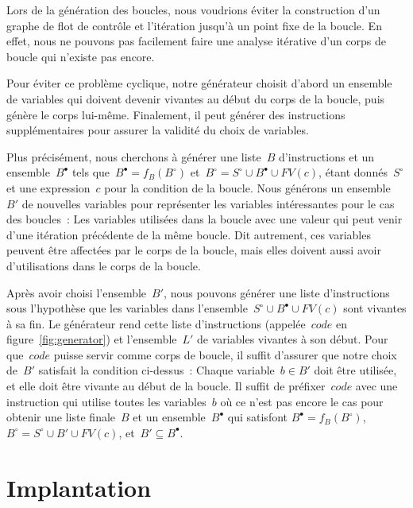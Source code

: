 \documentclass[a4paper]{easychair}
\newcommand{\liveout}[1]{\ensuremath{#1^{\circ}}}
\newcommand{\livein}[1]{\ensuremath{#1^{\bullet}}}
\def\union{\cup}
\begin{document}
Lors de la génération des boucles, nous voudrions éviter la construction
d'un graphe de flot de contrôle et l'itération jusqu'à un point fixe de la
boucle. En effet, nous ne pouvons pas facilement faire une analyse itérative
d'un corps de boucle qui n'existe pas encore.

Pour éviter ce problème cyclique, notre générateur choisit d'abord un
ensemble de variables qui doivent devenir vivantes au début du corps de la
boucle, puis génère le corps lui-même. Finalement, il peut générer des
instructions supplémentaires pour assurer la validité du choix de variables.

Plus précisément, nous cherchons à générer une liste~\(B\) d'instructions et
un ensemble~\(\livein{B}\) tels que~\(\livein{B} = f_B(\liveout{B})\)
et~\(\liveout{B} = \liveout{S} \union \livein{B} \union FV(c)\), étant
donnés~\(\liveout{S}\) et une expression~\(c\) pour la condition de la
boucle. Nous générons un ensemble~\(B'\) de nouvelles variables pour
représenter les variables intéressantes pour le cas des boucles~: Les
variables utilisées dans la boucle avec une valeur qui peut venir d'une
itération précédente de la même boucle. Dit autrement, ces variables peuvent
être affectées par le corps de la boucle, mais elles doivent aussi avoir
d'utilisations dans le corps de la boucle.

Après avoir choisi l'ensemble~\(B'\), nous pouvons générer une liste
d'instructions sous l'hypothèse que les variables dans
l'ensemble~\(\liveout{S} \union \livein{B} \union FV(c)\) sont vivantes à sa
fin. Le générateur rend cette liste d'instructions (appelée~\(code\) en
figure~\ref{fig:generator}) et l'ensemble~\(L'\) de variables vivantes à son
début. Pour que~\(code\) puisse servir comme corps de boucle, il suffit
d'assurer que notre choix de~\(B'\) satisfait la condition ci-dessus~:
Chaque variable~\(b \in B'\) doit être utilisée, et elle doit être vivante
au début de la boucle. Il suffit de préfixer~\(code\) avec une instruction
qui utilise toutes les variables~\(b\) où ce n'est pas encore le cas pour
obtenir une liste finale~\(B\) et un ensemble~\(\livein{B}\) qui satisfont
\(\livein{B} = f_B(\liveout{B})\), \(\liveout{B} = \liveout{S} \union B'
\union FV(c)\), et~\(B' \subseteq \livein{B}\).


\section{Implantation}
\end{document}
